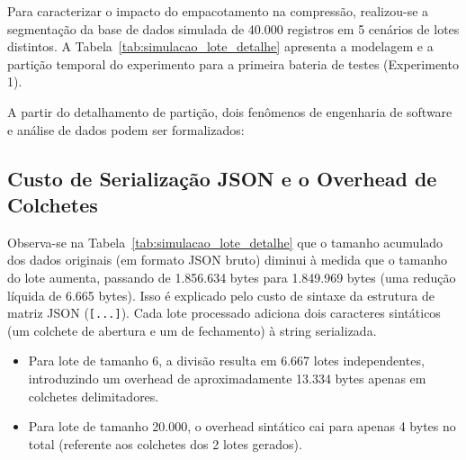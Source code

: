 \documentclass[
	12pt,
	openright,
	oneside,
	a4paper,
	english,
	brazil
	]{abntex2}
\begin{document}
Para caracterizar o impacto do empacotamento na compressão, realizou-se a segmentação da base de dados simulada de 40.000 registros em 5 cenários de lotes distintos. A Tabela~\ref{tab:simulacao_lote_detalhe} apresenta a modelagem e a partição temporal do experimento para a primeira bateria de testes (Experimento 1).

\begin{table}[H]
\centering
\caption{Detalhamento da partição dos dados em lotes no Experimento 1}
\label{tab:simulacao_lote_detalhe}
\end{table}

A partir do detalhamento de partição, dois fenômenos de engenharia de software e análise de dados podem ser formalizados:

\subsection{Custo de Serialização JSON e o Overhead de Colchetes}
Observa-se na Tabela~\ref{tab:simulacao_lote_detalhe} que o tamanho acumulado dos dados originais (em formato JSON bruto) diminui à medida que o tamanho do lote aumenta, passando de 1.856.634 bytes para 1.849.969 bytes (uma redução líquida de 6.665 bytes). Isso é explicado pelo custo de sintaxe da estrutura de matriz JSON (\texttt{[...]}). Cada lote processado adiciona dois caracteres sintáticos (um colchete de abertura e um de fechamento) à string serializada.
\begin{itemize}
    \item Para lote de tamanho 6, a divisão resulta em 6.667 lotes independentes, introduzindo um overhead de aproximadamente 13.334 bytes apenas em colchetes delimitadores.
    \item Para lote de tamanho 20.000, o overhead sintático cai para apenas 4 bytes no total (referente aos colchetes dos 2 lotes gerados).
\end{itemize}
\end{document}
